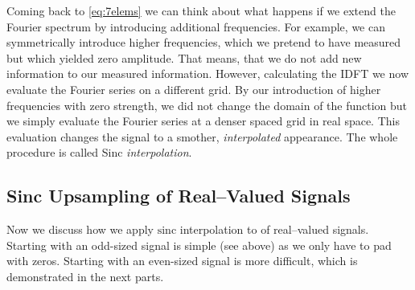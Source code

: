 \documentclass{juliacon}
\def\sinc{\mathrm{sinc}}
\begin{document}
    Coming back to \autoref{eq:7elems} we can think about what happens if we extend the Fourier spectrum by introducing additional frequencies. 
    For example, we can symmetrically introduce higher frequencies, which we pretend to have measured but which yielded zero amplitude. That means, that we do not add new information to our measured information.
    However, calculating the IDFT we now evaluate the Fourier series on a different grid.
    By our introduction of higher frequencies with zero strength, we did not change the domain of the function but we simply evaluate the Fourier series at a denser spaced grid in real space. This evaluation changes the signal to a smother, \textit{interpolated} appearance.
    The whole procedure is called Sinc \textit{interpolation}.\\
    
    \subsection{Sinc Upsampling of Real--Valued Signals}
        Now we discuss how we apply $\sinc$ interpolation to of real--valued signals.
        Starting with an odd-sized signal is simple (see above) as we only have to pad with zeros.
        Starting with an even-sized signal is more difficult, which is demonstrated in the next parts.
        
\end{document}
